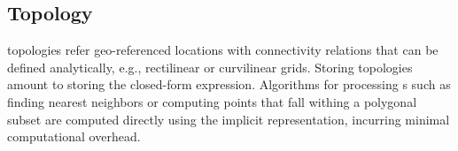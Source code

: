 \subsection{\cgrid{} Topology}
\cgrid{} topologies refer geo-referenced locations with connectivity
relations that can be defined analytically, e.g., rectilinear or
curvilinear grids. Storing \cgrid{} topologies amount to storing the
closed-form expression. Algorithms for processing \cgrid{}s such as
finding nearest neighbors or computing points that fall withing a
polygonal subset are computed directly using the implicit \cgrid{}
representation, incurring minimal computational overhead.
